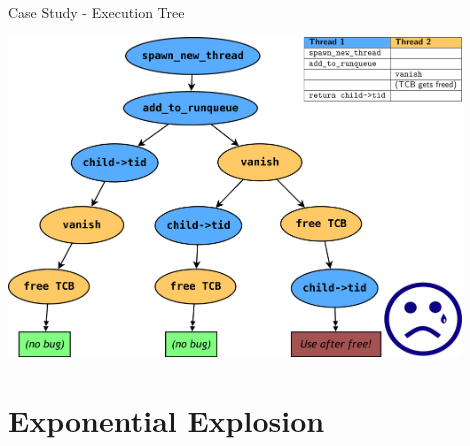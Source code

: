 \documentclass[xcolor=dvipsnames]{beamer}
\begin{document}
\begin{frame}{Case Study - Execution Tree}
	\begin{center}
		\includegraphics[width=0.9\textwidth]{threadfork2.png}
	\end{center}
\end{frame}



\section{Exponential Explosion}


\end{document}
